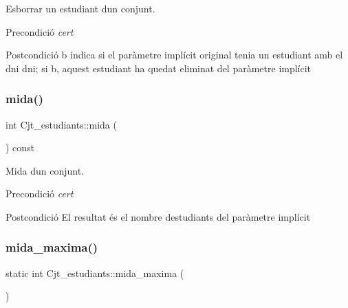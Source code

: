 Esborrar un estudiant d\textquotesingle{}un conjunt. 

\begin{DoxyPrecond}{Precondició}
{\itshape cert} 
\end{DoxyPrecond}
\begin{DoxyPostcond}{Postcondició}
b indica si el paràmetre implícit original tenia un estudiant amb el dni dni; si b, aquest estudiant ha quedat eliminat del paràmetre implícit 
\end{DoxyPostcond}
\mbox{\label{class_cjt__estudiants_a87c69704a0eff48a301cfff05e6dd587}} 
\subsubsection{\texorpdfstring{mida()}{mida()}}
{\footnotesize\ttfamily int Cjt\+\_\+estudiants\+::mida (\begin{DoxyParamCaption}{ }\end{DoxyParamCaption}) const}



Mida d\textquotesingle{}un conjunt. 

\begin{DoxyPrecond}{Precondició}
{\itshape cert} 
\end{DoxyPrecond}
\begin{DoxyPostcond}{Postcondició}
El resultat és el nombre d\textquotesingle{}estudiants del paràmetre implícit 
\end{DoxyPostcond}
\mbox{\label{class_cjt__estudiants_a171fdff58b408ccbf647ab594b5eafa4}} 
\subsubsection{\texorpdfstring{mida\+\_\+maxima()}{mida\_maxima()}}
{\footnotesize\ttfamily static int Cjt\+\_\+estudiants\+::mida\+\_\+maxima (\begin{DoxyParamCaption}{ }\end{DoxyParamCaption})\hspace{0.3cm}{\ttfamily [static]}}



